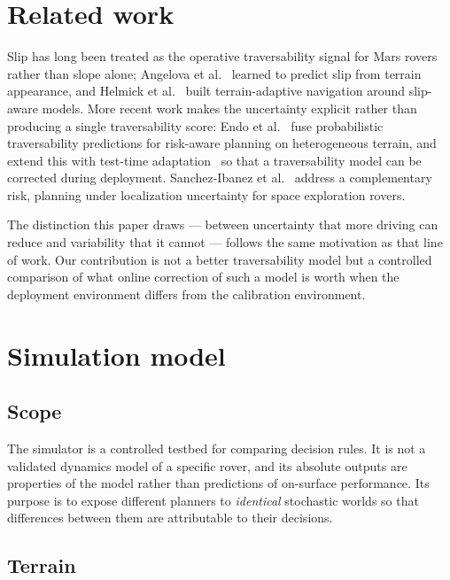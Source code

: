 \documentclass[11pt]{article}
\begin{document}
\section{Related work}
\label{sec:related}

Slip has long been treated as the operative traversability signal for Mars
rovers rather than slope alone; Angelova et al.~\cite{angelova2006slip} learned to predict slip from
terrain appearance, and Helmick et al.~\cite{helmick2007terrain} built
terrain-adaptive navigation around slip-aware models. More recent work makes the uncertainty explicit
rather than producing a single traversability score: Endo et al.~\cite{endo2023riskaware} fuse
probabilistic traversability predictions for risk-aware planning on
heterogeneous terrain, and extend this with test-time
adaptation~\cite{endo2024deepprob} so that a traversability model can be
corrected during deployment. Sanchez-Ibanez et al.~\cite{sanchez2022riskaware}
address a complementary risk, planning under localization uncertainty for
space exploration rovers.

The distinction this paper draws --- between uncertainty that more driving can
reduce and variability that it cannot --- follows the same motivation as that
line of work. Our contribution is not a better traversability model but a
controlled comparison of what online correction of such a model is worth when
the deployment environment differs from the calibration environment.

\section{Simulation model}
\label{sec:model}

\subsection{Scope}

The simulator is a controlled testbed for comparing decision rules. It is not
a validated dynamics model of a specific rover, and its absolute outputs are
properties of the model rather than predictions of on-surface performance. Its
purpose is to expose different planners to \emph{identical} stochastic worlds
so that differences between them are attributable to their decisions.

\subsection{Terrain}
\end{document}

